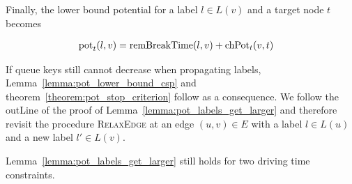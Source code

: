 Finally, the lower bound potential for a label $l \in L(v)$ and a target node $t$ becomes

\begin{align}\label{eq:multiple_breaks_pot}
	\begin{split}
		\operatorname{pot}_t(l,v) & =\operatorname{remBreakTime}(l,v) + \operatorname{chPot}_t(v,t)
	\end{split}
\end{align}

If queue keys still cannot decrease when propagating labels, Lemma~\ref{lemma:pot_lower_bound_csp} and theorem~\ref{theorem:pot_stop_criterion} follow as a consequence. We follow the outLine of the proof of Lemma~\ref{lemma:pot_labels_get_larger} and therefore revisit the procedure \textsc{RelaxEdge} at an edge $(u,v) \in E$ with a label $l \in L(u)$ and a new label $l' \in L(v)$.

\begin{lemma}\label{lemma:pot_labels_get_larger_n}
	Lemma~\ref{lemma:pot_labels_get_larger} still holds for two driving time constraints.
\end{lemma}

